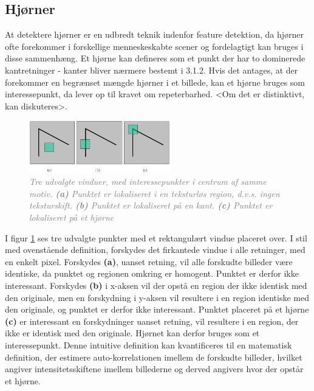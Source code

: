 \subsection{Hjørner}\label{subsec:corner}
At detektere hjørner er en udbredt teknik indenfor feature detektion, da hjørner ofte forekommer i forskellige menneskeskabte scener og fordelagtigt kan bruges i disse sammenhæng. Et hjørne kan defineres som et punkt der har to dominerede kantretninger - kanter bliver nærmere bestemt i 3.1.2. Hvis det antages, at der forekommer en begrænset mængde hjørner i et billede, kan et hjørne bruges som interessepunkt, da lever op til kravet om repeterbarhed. <Om det er distinktivt, kan diskuteres>.
\begin{figure}[H]
    \centering
    \includegraphics[width=0.55\textwidth]{fig/6.png}
    \vspace{-1em}   
    \begin{center}    
    \caption{\textcolor{gray}{\footnotesize \textit{
     Tre udvalgte vinduer, med interessepunkter i centrum af samme motiv. \textbf{(a)} Punktet er lokaliseret i en teksturløs region, d.v.s. ingen teksturskift. \textbf{(b)} Punktet er lokaliseret på en kant. \textbf{(c)} Punktet er lokaliseret på et hjørne }}}
    \label{fig:2}
     \end{center}
    \vspace{-2.7em}  
  \end{figure}  
\noindent
I figur \ref{fig:2} ses tre udvalgte punkter med et rektangulært vindue placeret over. I stil med ovenstående definition, forskydes det firkantede vindue i alle retninger, med en enkelt pixel. Forskydes  \textbf{(a)}, uanset retning, vil alle forskudte billeder være identiske, da punktet og regionen omkring er homogent. Punktet er derfor ikke interessant. Forskydes \textbf{(b)} i x-aksen vil der opstå en region der ikke identisk med den originale, men en forskydning i y-aksen vil resultere i en region identiske med den originale, og punktet er derfor ikke interessant. Punktet placeret på et hjørne \textbf{(c)} er interessant en forskydninger uanset retning, vil resultere i en region, der ikke er identisk med den originale. Hjørnet kan derfor bruges som et interessepunkt. Denne intuitive definition kan kvantificeres til en matematisk definition, der estimere auto-korrelationen imellem de forskudte billeder, hvilket angiver intensitetsskiftene imellem billederne og derved angivers hvor der opstår et hjørne.
